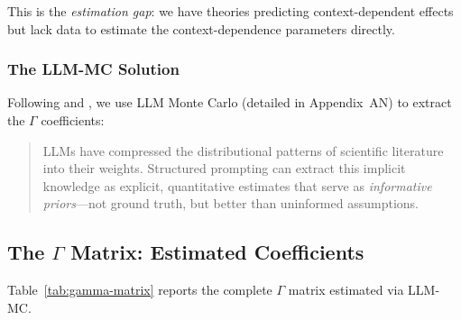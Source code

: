 This is the \emph{estimation gap}: we have theories predicting context-dependent effects 
but lack data to estimate the context-dependence parameters directly.

\subsubsection{The LLM-MC Solution}

Following \citet{llmpriors2025scientific} and \citet{zhu2024eliciting}, we use 
LLM Monte Carlo (detailed in Appendix~AN) to extract the $\Gamma$ coefficients:

\begin{quote}
LLMs have compressed the distributional patterns of scientific literature into their weights.
Structured prompting can extract this implicit knowledge as explicit, quantitative estimates
that serve as \emph{informative priors}---not ground truth, but better than uninformed assumptions.
\end{quote}

\subsection{The $\Gamma$ Matrix: Estimated Coefficients}

Table~\ref{tab:gamma-matrix} reports the complete $\Gamma$ matrix estimated via LLM-MC.

